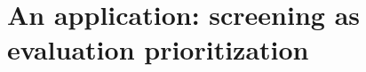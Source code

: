 \documentclass{article}
\begin{document}
\section{An application: screening as evaluation prioritization}
\label{sec:condition_scoring}
\label{app:prioritization}
\end{document}
